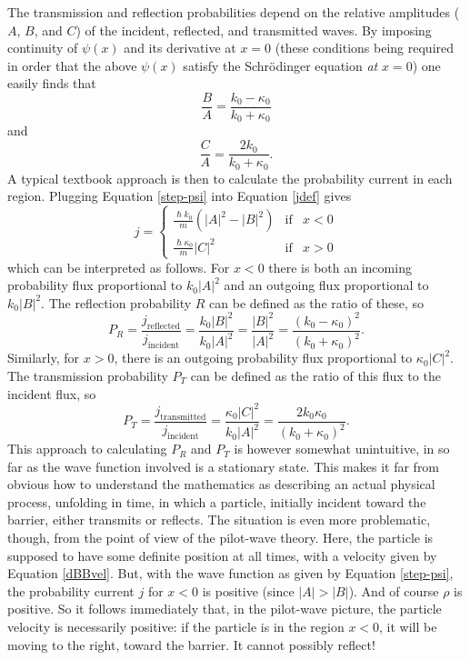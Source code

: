 \documentclass[aps,prc,onecolumn,letterpaper,floatfix,12pt]{revtex4}
\renewcommand{\hbar}{\hslash}
\begin{document}
The transmission and reflection probabilities depend on the relative
amplitudes ($A$, $B$, and $C$) of the incident, reflected, and
transmitted waves.  By imposing continuity of $\psi(x)$ and its
derivative at $x=0$ (these conditions being required in order that the
above $\psi(x)$ satisfy the Schr\"odinger equation \emph{at} $x=0$)
one easily finds that
\begin{equation}
\frac{B}{A} = \frac{k_0 - \kappa_0}{k_0 + \kappa_0}
\label{BA}
\end{equation}
and
\begin{equation}
\frac{C}{A} = \frac{2k_0}{k_0 + \kappa_0}.
\label{CA}
\end{equation}
A typical textbook approach is then to calculate the probability
current in each region.  Plugging Equation \eqref{step-psi} into
Equation \eqref{jdef} gives
\begin{equation}
j = \left\{
\begin{array}{lcc}
\frac{\hbar k_0}{m} \left( |A|^2 - |B|^2\right) &\text{if} & x<0 \\
\frac{\hbar \kappa_0}{m} |C|^2 & \text{if} & x>0 
\end{array}
\right.
\end{equation}
which can be interpreted as follows.  For $x<0$ there is both an
incoming probability flux proportional to $k_0 |A|^2$ and an outgoing
flux proportional to $k_0 |B|^2$.  The reflection probability $R$ can be
defined as the ratio of these, so
\begin{equation}
P_R = \frac{j_{\text{reflected}}}{j_{\text{incident}}} =
\frac{k_0|B|^2}{k_0|A|^2} = \frac{|B|^2}{|A|^2} = \frac{(k_0-\kappa_0)^2}{(k_0+\kappa_0)^2}.
\label{P_R}
\end{equation}
Similarly, for $x>0$, there is an outgoing probability flux
proportional to $\kappa_0 |C|^2$.  The transmission probability $P_T$ can
be defined as the ratio of this flux to the incident flux, so
\begin{equation}
P_T = \frac{j_{\text{transmitted}}}{j_{\text{incident}}} = \frac{\kappa_0
  |C|^2}{k_0 |A|^2} = \frac{2 k_0 \kappa_0}{(k_0 + \kappa_0)^2}.
\label{P_T}
\end{equation}
This approach to calculating $P_R$ and $P_T$ is however somewhat unintuitive,
in so far as the wave function involved is a stationary state.  This
makes it far from obvious how to understand the mathematics as
describing an actual physical process, unfolding in time, in which a particle, initially
incident toward the barrier, either transmits or reflects.  The
situation is even more problematic, though, from the point of view of
the pilot-wave theory.  Here, the particle is supposed to have some
definite position at all times, with a velocity given by Equation
\eqref{dBBvel}.  But, with the wave function as given by
Equation \eqref{step-psi}, the probability current $j$ for $x<0$ is
positive (since $|A| > |B|$).  And of course $\rho$ is positive.  So it follows
immediately that, in the pilot-wave picture, the particle velocity is
necessarily positive:  if the particle is in the region $x<0$, it will be moving
to the right, toward the barrier.  It cannot possibly reflect!
\end{document}
